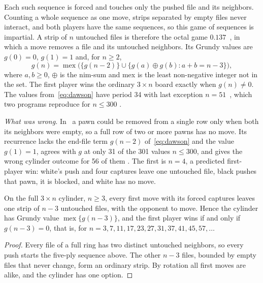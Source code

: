 Each such sequence is forced and touches only the pushed file and its neighbors. Counting a whole sequence as
one move, strips separated by empty files never interact, and both players have the same sequences, so this
game of sequences is impartial. A strip of $n$ untouched files is therefore the octal game $\mathbf{0.137}$~\cite{GuySmith1956,WinningWays},
in which a move removes a file and its untouched neighbors. Its Grundy values are $g(0)=0$, $g(1)=1$ and,
for $n\ge2$,
\begin{equation}\label{eq:dawson}
g(n)=\operatorname{mex}\bigl(\{g(n-2)\}\cup\{g(a)\oplus g(b) : a+b=n-3\}\bigr),
\end{equation}
where $a,b\ge0$, $\oplus$ is the nim-sum and mex is the least non-negative integer not in the set. The first
player wins the ordinary $3\times n$ board exactly when $g(n)\ne0$. The values from~\eqref{eq:dawson}
have period 34 with last exception $n=51$~\cite{GuySmith1956}, which two programs reproduce for $n\le300$
.

\emph{What was wrong.} In~\cite{Study2025} a pawn could be removed from a single row only when
both its neighbors were empty, so a full row of two or more pawns has no move. Its recurrence lacks the
end-file term $g(n-2)$ of~\eqref{eq:dawson} and the value $g(1)=1$, agrees with $g$ at only 31 of the 301 values
$n\le300$, and gives the wrong cylinder outcome for 56 of them . The first is $n=4$, a predicted
first-player win: white's push and four captures leave one untouched file, black pushes that pawn, it is
blocked, and white has no move.

\begin{theorem}\label{thm:ring}
On the full $3\times n$ cylinder, $n\ge3$, every first move with its forced captures leaves one strip of
$n-3$ untouched files, with the opponent to move. Hence the cylinder has Grundy value
$\operatorname{mex}\{g(n-3)\}$, and the first player wins if and only if $g(n-3)=0$, that is, for
$n=3,7,11,17,23,27,31,37,41,45,57,\dots$
\end{theorem}

\begin{proof}
Every file of a full ring has two distinct untouched neighbors, so every push starts the five-ply sequence
above. The other $n-3$ files, bounded by empty files that never change, form an ordinary strip. By
rotation all first moves are alike, and the cylinder has one option.
\end{proof}

